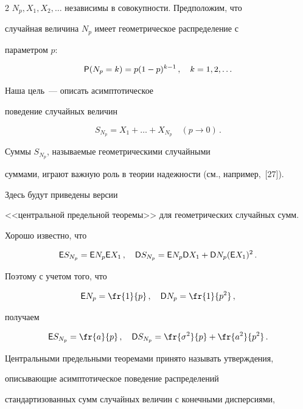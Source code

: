 \begin{multicols}{2}
$N_p,X_1,X_2,\ldots$ независимы в совокупности. Предположим, что


случайная величина $N_p$ имеет геометрическое распределение с


параметром $p$:


\begin{equation}


{\sf P}(N_p=k)=p(1-p)^{k-1}\,,\quad k=1,2,\ldots\label{4.1b}


\end{equation}


Наша цель~--- описать асимптотическое


поведение случайных величин


$$


S_{N_p}=X_1+\ldots+X_{N_p}\quad (p\to 0)\,.


$$


Суммы $S_{N_p}$, называемые геометрическими случайными


суммами, играют важную роль в теории надежности (см., например,~[27]). 


Здесь будут приведены версии


<<центральной предельной теоремы>> для геометрических случайных сумм.





Хорошо известно, что


$$


{\sf E}S_{N_p}={\sf E}N_p{\sf E}X_1\,,\quad


{\sf D}S_{N_p}={\sf E}N_p{\sf D}X_1+{\sf D}N_p({\sf E}X_1)^2\,.


$$


Поэтому с учетом того, что


$$


{\sf E}N_p=\fr{1}{p}\,,\quad


{\sf D}N_p=\fr{1}{p^2}\,,


$$


получаем


$$


{\sf E}S_{N_p}=\fr{a}{p}\,,\quad


{\sf D}S_{N_p}=\fr{\sigma^2}{p}+\fr{a^2}{p^2}\,.


$$


Центральными предельными теоремами принято называть утверждения,


описывающие асимптотическое поведение распределений


стандартизованных сумм случайных величин с конечными дис\-пер\-сиями,



\end{multicols}
